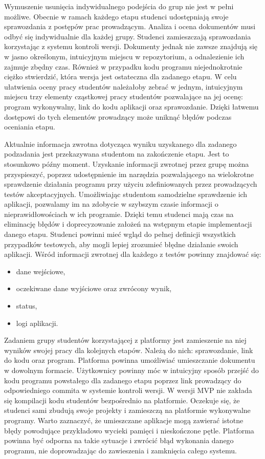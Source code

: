 Wymuszenie usunięcia indywidualnego podejścia do grup nie jest w pełni możliwe. 
Obecnie w ramach każdego etapu studenci udostępniają swoje sprawozdania z postępów prac prowadzącym.
Analiza i ocena dokumentów musi odbyć się indywidualnie dla każdej grupy.
Studenci zamieszczają sprawozdania korzystając z systemu kontroli wersji.
Dokumenty jednak nie zawsze znajdują się w jasno określonym, intuicyjnym miejscu w repozytorium, a odnalezienie ich zajmuje zbędny czas.
Również w przypadku kodu programu niejednokrotnie ciężko stwierdzić, która wersja jest ostateczna dla zadanego etapu.
W celu ułatwienia oceny pracy studentów należałoby zebrać w jednym, intuicyjnym miejscu trzy elementy cząstkowej pracy studentów pozwalające na jej ocenę: program wykonywalny, link do kodu aplikacji oraz sprawozdanie.
Dzięki łatwemu dostępowi do tych elementów prowadzący może uniknąć błędów podczas oceniania etapu.
 
Aktualnie informacja zwrotna dotycząca wyniku uzyskanego dla zadanego podzadania jest przekazywana studentom na zakończenie etapu.
Jest to stosunkowo późny moment.
Uzyskanie informacji zwrotnej przez grupę można przyspieszyć, poprzez udostępnienie im narzędzia pozwalającego na wielokrotne sprawdzenie działania programu przy użyciu zdefiniowanych przez prowadzących testów akceptacyjnych.
Umożliwiając studentom samodzielne sprawdzenie ich aplikacji, pozwalamy im na zdobycie w szybszym czasie informacji o nieprawidłowościach w ich programie.
Dzięki temu studenci mają czas na eliminację błędów i doprecyzowanie założeń na wstępnym etapie implementacji danego etapu.
Studenci powinni mieć wgląd do pełnej definicji wszystkich przypadków testowych, aby mogli lepiej zrozumieć błędne działanie swoich aplikacji.
Wśród informacji zwrotnej dla każdego z testów powinny znajdować się:
\begin{itemize}
\item dane wejściowe,
\item oczekiwane dane wyjściowe oraz zwrócony wynik,
\item status,
\item logi aplikacji.
\end{itemize}

Zadaniem grupy studentów korzystającej z platformy jest zamieszenie na niej wyników swojej pracy dla kolejnych etapów.
Należą do nich: sprawozdanie, link do kodu oraz program.
Platforma powinna umożliwiać umieszczanie dokumentu w dowolnym formacie.
Użytkownicy powinny móc w intuicyjny sposób przejść do kodu programu powstałego dla zadanego etapu poprzez link prowadzący do odpowiedniego commita w systemie kontroli wersji.
W wersji MVP nie zakłada się kompilacji kodu studentów bezpośrednio na platformie.
Oczekuje się, że studenci sami zbudują swoje projekty i zamieszczą na platformie wykonywalne programy.
Warto zaznaczyć, że umieszczane aplikacje mogą zawierać istotne błędy powodujące przykładowo wycieki pamięci i nieskończone pętle.
Platforma powinna być odporna na takie sytuacje i zwrócić błąd wykonania danego programu, nie doprowadzając do zawieszenia i zamknięcia całego systemu.


